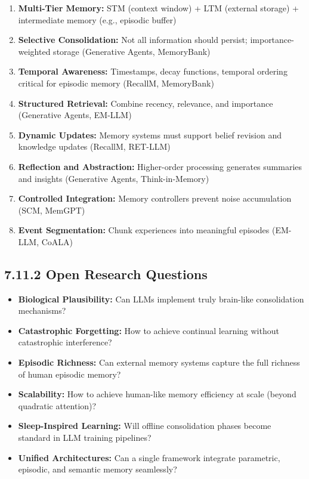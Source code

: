\documentclass[11pt,letterpaper]{article}
\begin{document}
\begin{enumerate}[leftmargin=*]
    \item \textbf{Multi-Tier Memory:} STM (context window) + LTM (external storage) + intermediate memory (e.g., episodic buffer)
    \item \textbf{Selective Consolidation:} Not all information should persist; importance-weighted storage (Generative Agents, MemoryBank)
    \item \textbf{Temporal Awareness:} Timestamps, decay functions, temporal ordering critical for episodic memory (RecallM, MemoryBank)
    \item \textbf{Structured Retrieval:} Combine recency, relevance, and importance (Generative Agents, EM-LLM)
    \item \textbf{Dynamic Updates:} Memory systems must support belief revision and knowledge updates (RecallM, RET-LLM)
    \item \textbf{Reflection and Abstraction:} Higher-order processing generates summaries and insights (Generative Agents, Think-in-Memory)
    \item \textbf{Controlled Integration:} Memory controllers prevent noise accumulation (SCM, MemGPT)
    \item \textbf{Event Segmentation:} Chunk experiences into meaningful episodes (EM-LLM, CoALA)
\end{enumerate}

\subsection{7.11.2 Open Research Questions}

\begin{itemize}[leftmargin=*]
    \item \textbf{Biological Plausibility:} Can LLMs implement truly brain-like consolidation mechanisms?
    \item \textbf{Catastrophic Forgetting:} How to achieve continual learning without catastrophic interference?
    \item \textbf{Episodic Richness:} Can external memory systems capture the full richness of human episodic memory?
    \item \textbf{Scalability:} How to achieve human-like memory efficiency at scale (beyond quadratic attention)?
    \item \textbf{Sleep-Inspired Learning:} Will offline consolidation phases become standard in LLM training pipelines?
    \item \textbf{Unified Architectures:} Can a single framework integrate parametric, episodic, and semantic memory seamlessly?
\end{itemize}
\end{document}
